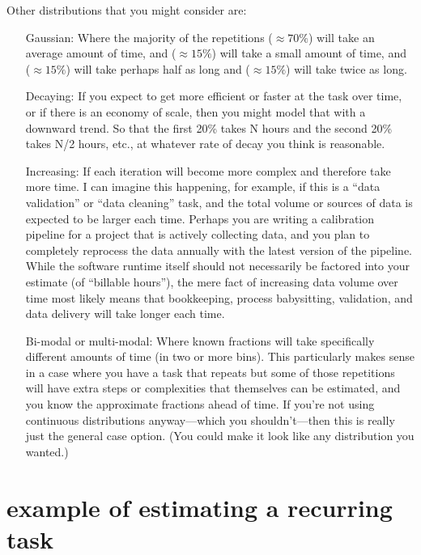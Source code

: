 \documentclass[12pt,oneside]{book}
\begin{document}
Other distributions that you might consider are:
\begin{itemize}[wide, labelwidth=!, labelindent=0pt, font=\bfseries]
\item[Gaussian:] Where the majority of the repetitions ($\approx{70}\%$) will take an average amount of time, and ($\approx{15}\%$) will take a small amount of time, and ($\approx{15}\%$) will take perhaps half as long and ($\approx{15}\%$) will take twice as long.
\item[Decaying:] If you expect to get more efficient or faster at the task over time, or if there is an economy of scale, then you might model that with a downward trend. So that the first 20\% takes N hours and the second 20\% takes N/2 hours, etc., at whatever rate of decay you think is reasonable.
\break
\item[Increasing:] If each iteration will become more complex and therefore take more time. I can imagine this happening, for example, if this is a ``data validation'' or ``data cleaning'' task, and the total volume or sources of data is expected to be larger each time. Perhaps you are writing a calibration pipeline for a project that is actively collecting data, and you plan to completely reprocess the data annually with the latest version of the pipeline. While the software runtime itself should not necessarily be factored into your estimate (of ``billable hours''), the mere fact of increasing data volume over time most likely means that bookkeeping, process babysitting, validation, and data delivery will take longer each time.
\item[Bi-modal or multi-modal:] Where known fractions will take specifically different amounts of time (in two or more bins). This particularly makes sense in a case where you have a task that repeats but some of those repetitions will have extra steps or complexities that themselves can be estimated, and you know the approximate fractions ahead of time. If you're not using continuous distributions anyway---which you shouldn't---then this is really just the general case option. (You could make it look like any distribution you wanted.)
\end{itemize}

\section*{example of estimating a recurring task}
\end{document}
